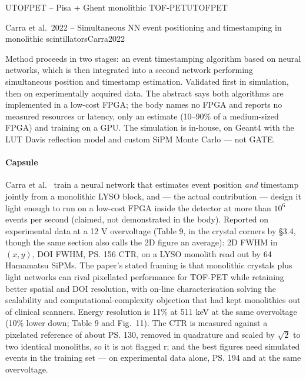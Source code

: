 \begin{programnote}{UTOFPET -- Pisa + Ghent monolithic TOF-PET}{UTOFPET}
\begin{papernote}{Carra et al.\ 2022 -- Simultaneous NN event positioning and timestamping in monolithic scintillators}{Carra2022}

Method proceeds in two stages: an event timestamping algorithm based on neural
networks, which is then integrated into a second network performing simultaneous
position and timestamp estimation. Validated first in simulation, then on
experimentally acquired data. The abstract says both algorithms are
implemented in a low-cost FPGA; the body names no FPGA and reports no measured
resources or latency, only an estimate (10--90\% of a medium-sized FPGA) and
training on a GPU. The simulation is in-house, on Geant4 with the LUT Davis
reflection model and custom SiPM Monte Carlo --- not GATE.

\paragraph{Capsule}
Carra et al.\ \cite{Carra2022} train a neural network that estimates event position
\emph{and} timestamp jointly from a monolithic LYSO block, and --- the actual
contribution --- design it light enough to run on a low-cost FPGA inside the
detector at more than $10^{6}$ events per second (claimed, not demonstrated in
the body). Reported on experimental data at a 12 V
overvoltage (Table 9, in the crystal corners by §3.4, though the same section
also calls the 2D figure an average):  2D FWHM in $(x,y)$, 
DOI FWHM,
\ps{156} CTR, on a
 LYSO monolith read out by 64
 Hamamatsu SiPMs. The paper's stated framing is
that monolithic crystals plus light networks can rival pixellated performance for
TOF-PET while retaining better spatial and DOI resolution, with on-line
characterisation solving the scalability and computational-complexity objection
that had kept monolithics out of clinical scanners.
Energy resolution is 11\% at 511 keV at the same overvoltage (10\% lower down;
Table 9 and Fig.\ 11).
The CTR is measured against a pixelated reference of about \ps{130}, removed in
quadrature and scaled by $\sqrt{2}$ to two identical monoliths, so it is not
flagged r; and the best figures need simulated events in the training set ---
on experimental data alone, \ps{194} and  at the same overvoltage.


\end{papernote}
\end{programnote}
